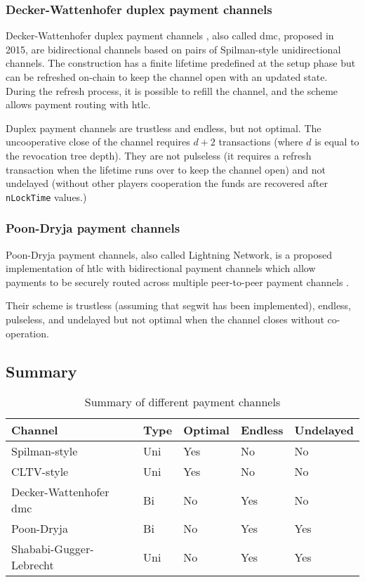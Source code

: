 \subsubsection{Decker-Wattenhofer duplex payment channels}

Decker-Wattenhofer duplex payment channels \cite{Decker2015fast}, also called
\gls{dmc}, proposed in 2015, are bidirectional channels based on pairs of
Spilman-style unidirectional channels. The construction has a finite lifetime
predefined at the setup phase but can be refreshed on-chain to keep the channel
open with an updated state. During the refresh process, it is possible to refill
the channel, and the scheme allows payment routing with \gls{htlc}.

Duplex payment channels are trustless and endless, but not optimal. The
uncooperative close of the channel requires $d + 2$ transactions
(where $d$ is equal to the revocation tree depth). They are not
pulseless (it requires a refresh transaction when the lifetime runs over to keep
the channel open) and not undelayed (without other players cooperation the funds are
recovered after \texttt{nLockTime} values.)

\subsubsection{Poon-Dryja payment channels}

Poon-Dryja payment channels, also called Lightning Network, is a proposed
implementation of \gls{htlc} with bidirectional payment channels which allow
payments to be securely routed across multiple peer-to-peer payment channels
\cite{poon2016bitcoin}.

Their scheme is trustless (assuming that \gls{segwit} has been implemented),
endless, pulseless, and undelayed but not optimal when the channel closes
without co-operation.

\subsection{Summary}

\begin{table}[h]
  \begin{tabularx}{\textwidth}{ | X | l | l | l | l |}
  \hline
  Channel & Type & Optimal & Endless & Undelayed \\ \hline \hline
  Spilman-style & Uni & Yes & No & No \\ \hline
  CLTV-style & Uni & Yes & No & No \\ \hline
  Decker-Wattenhofer \gls{dmc} & Bi & No & Yes & No \\ \hline
  Poon-Dryja & Bi & No & Yes & Yes \\ \hline
  Shababi-Gugger-Lebrecht & Uni & No & Yes & Yes \\
  \hline
  \end{tabularx}
  \caption{Summary of different payment channels}
  \label{fig:summaryPaymentChannel}
\end{table}

